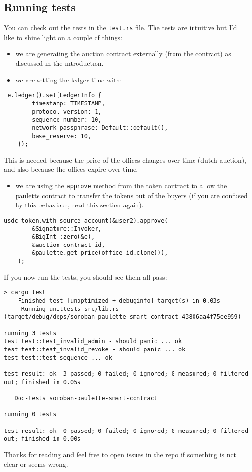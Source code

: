 \documentclass[10pt]{article}
\begin{document}
\subsection*{Running tests}
You can check out the tests in the \texttt{test.rs} file. The tests are intuitive but I'd like to shine light on a couple of things:

\begin{itemize}
  \item we are generating the auction contract externally (from the contract) as discussed in the introduction.
  \item we are setting the ledger time with:
\end{itemize}

\begin{verbatim}
 e.ledger().set(LedgerInfo {
        timestamp: TIMESTAMP,
        protocol_version: 1,
        sequence_number: 10,
        network_passphrase: Default::default(),
        base_reserve: 10,
    });
\end{verbatim}

This is needed because the price of the offices changes over time (dutch auction), and also because the offices expire over time.

\begin{itemize}
  \item we are using the \texttt{approve} method from the token contract to allow the paulette contract to transfer the tokens out of the buyers (if you are confused by this behaviour, read \href{#interacting-with-the-token-contract}{this section again}):
\end{itemize}

\begin{verbatim}
usdc_token.with_source_account(&user2).approve(
        &Signature::Invoker,
        &BigInt::zero(&e),
        &auction_contract_id,
        &paulette.get_price(office_id.clone()),
    );
\end{verbatim}

If you now run the tests, you should see them all pass:

\begin{verbatim}
> cargo test
    Finished test [unoptimized + debuginfo] target(s) in 0.03s
     Running unittests src/lib.rs (target/debug/deps/soroban_paulette_smart_contract-43806aa4f75ee959)

running 3 tests
test test::test_invalid_admin - should panic ... ok
test test::test_invalid_revoke - should panic ... ok
test test::test_sequence ... ok

test result: ok. 3 passed; 0 failed; 0 ignored; 0 measured; 0 filtered out; finished in 0.05s

   Doc-tests soroban-paulette-smart-contract

running 0 tests

test result: ok. 0 passed; 0 failed; 0 ignored; 0 measured; 0 filtered out; finished in 0.00s

\end{verbatim}

Thanks for reading and feel free to open issues in the repo if something is not clear or seems wrong.
\end{document}
